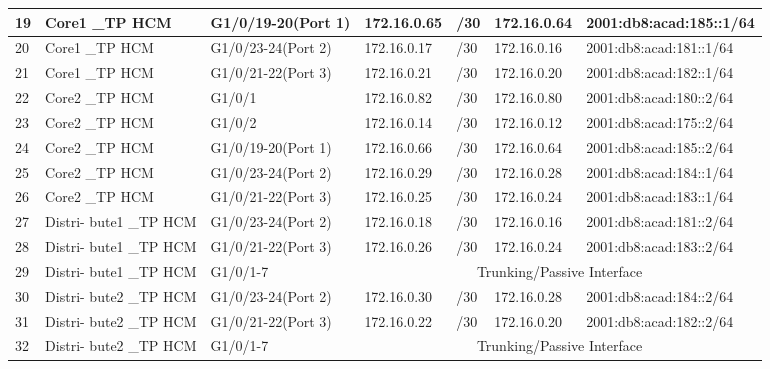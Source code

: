 \documentclass[12pt,a4paper]{report}
\begin{document}
\begin{center}
\begin{longtable}{|p{}|p{}|p{}|p{}|p{}|p{}|p{}|}
\hline  19  &  Core1 \_TP HCM  &  G1/0/19-20(Port 1)  &  172.16.0.65  &  /30  &  172.16.0.64  &  2001:db8:acad:185::1/64 \\
\hline  20  &  Core1 \_TP HCM  &  G1/0/23-24(Port 2)  &  172.16.0.17  &  /30  &  172.16.0.16  &  2001:db8:acad:181::1/64 \\
\hline  21  &  Core1 \_TP HCM  &  G1/0/21-22(Port 3)  &  172.16.0.21  &  /30  &  172.16.0.20  &  2001:db8:acad:182::1/64 \\
\hline  22  &  Core2 \_TP HCM  &  G1/0/1  &  172.16.0.82  &  /30  &  172.16.0.80  &  2001:db8:acad:180::2/64 \\
\hline  23  &  Core2 \_TP HCM  &  G1/0/2  &  172.16.0.14  &  /30  &  172.16.0.12  &  2001:db8:acad:175::2/64 \\
\hline  24  &  Core2 \_TP HCM  &  G1/0/19-20(Port 1)  &  172.16.0.66  &  /30  &  172.16.0.64  &  2001:db8:acad:185::2/64 \\
\hline  25  &  Core2 \_TP HCM  &  G1/0/23-24(Port 2)  &  172.16.0.29  &  /30  &  172.16.0.28  &  2001:db8:acad:184::1/64 \\
\hline  26  &  Core2 \_TP HCM  &  G1/0/21-22(Port 3)  &  172.16.0.25  &  /30  &  172.16.0.24  &  2001:db8:acad:183::1/64 \\
\hline  27  &  Distri- bute1 \_TP HCM  &  G1/0/23-24(Port 2)  &  172.16.0.18  &  /30  &  172.16.0.16  &  2001:db8:acad:181::2/64 \\
\hline  28  &  Distri- bute1 \_TP HCM  &  G1/0/21-22(Port 3)  &  172.16.0.26  &  /30  &  172.16.0.24  &  2001:db8:acad:183::2/64 \\
\hline  29  &  Distri- bute1 \_TP HCM  &  G1/0/1-7  &    \multicolumn{4}{|c|}{Trunking/Passive Interface} \\
\hline  30  &  Distri- bute2 \_TP HCM  &  G1/0/23-24(Port 2)  &  172.16.0.30  &  /30  &  172.16.0.28  &  2001:db8:acad:184::2/64 \\
\hline  31  &  Distri- bute2 \_TP HCM  &  G1/0/21-22(Port 3)  &  172.16.0.22  &  /30  &  172.16.0.20  &  2001:db8:acad:182::2/64 \\
\hline  32  &  Distri- bute2 \_TP HCM  &  G1/0/1-7  &    \multicolumn{4}{|c|}{Trunking/Passive Interface} \\
		

\end{longtable}
\end{center}
\end{document}
